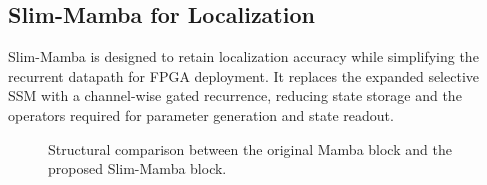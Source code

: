 \documentclass[lettersize,journal]{IEEEtran}
\begin{document}
\subsection{Slim-Mamba for Localization}

Slim-Mamba is designed to retain localization accuracy while simplifying
the recurrent datapath for FPGA deployment. It replaces the expanded
selective SSM with a channel-wise gated recurrence, reducing state storage
and the operators required for parameter generation and state readout.

\begin{figure}[!t]
  \centering
    
    \caption{Structural comparison between the original Mamba block and the proposed
    Slim-Mamba block.}
    \label{fig:slim_mamba_replacement}
\end{figure}
\end{document}
